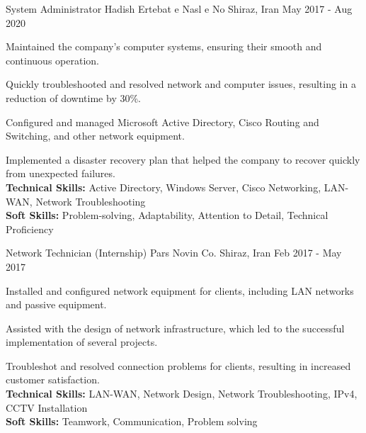 \begin{cventries}
    \cventry
    {System Administrator} %
    {Hadish Ertebat e Nasl e No} %
    {Shiraz, Iran} %
    {May 2017 - Aug 2020} %
    {
      \begin{cvitems} %
        \item {Maintained the company's computer systems, ensuring their smooth and continuous operation.}
        \item {Quickly troubleshooted and resolved network and computer issues, resulting in a reduction of downtime by 30\%.}
        \item {Configured and managed Microsoft Active Directory, Cisco Routing and Switching, and other network equipment.}
        \item {Implemented a disaster recovery plan that helped the company to recover quickly from unexpected failures.
        \\\textbf{Technical Skills:} Active Directory, Windows Server, Cisco Networking, LAN-WAN, Network Troubleshooting
        \\\textbf{Soft Skills:} Problem-solving, Adaptability, Attention to Detail, Technical Proficiency}
      \end{cvitems}
    }

  \cventry
    {Network Technician (Internship)} %
    {Pars Novin Co.} %
    {Shiraz, Iran} %
    {Feb 2017 - May 2017} %
    {
      \begin{cvitems} %
        \item {Installed and configured network equipment for clients, including LAN networks and passive equipment.}
        \item {Assisted with the design of network infrastructure, which led to the successful implementation of several projects.}
        \item {Troubleshot and resolved connection problems for clients, resulting in increased customer satisfaction.
        \\\textbf{Technical Skills:} LAN-WAN, Network Design, Network Troubleshooting, IPv4, CCTV Installation
        \\\textbf{Soft Skills:} Teamwork, Communication, Problem solving}
      \end{cvitems}
    }


\end{cventries}

